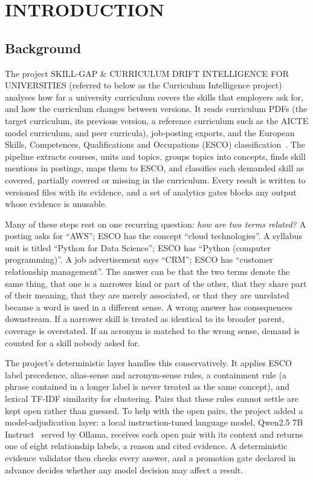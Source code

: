 \chapter{INTRODUCTION}
\label{ch:intro}

\section{Background}
\label{sec:background}

The project SKILL-GAP \& CURRICULUM DRIFT INTELLIGENCE FOR UNIVERSITIES (referred to below as the Curriculum Intelligence project) analyses how far a university curriculum covers the skills that employers ask for, and how the curriculum changes between versions. It reads curriculum PDFs (the target curriculum, its previous version, a reference curriculum such as the AICTE model curriculum, and peer curricula), job-posting exports, and the European Skills, Competences, Qualifications and Occupations (ESCO) classification~\cite{esco2024model}. The pipeline extracts courses, units and topics, groups topics into concepts, finds skill mentions in postings, maps them to ESCO, and classifies each demanded skill as covered, partially covered or missing in the curriculum. Every result is written to versioned files with its evidence, and a set of analytics gates blocks any output whose evidence is unusable.

Many of these steps rest on one recurring question: \emph{how are two terms related?} A posting asks for ``AWS''; ESCO has the concept ``cloud technologies''. A syllabus unit is titled ``Python for Data Science''; ESCO has ``Python (computer programming)''. A job advertisement says ``CRM''; ESCO has ``customer relationship management''. The answer can be that the two terms denote the same thing, that one is a narrower kind or part of the other, that they share part of their meaning, that they are merely associated, or that they are unrelated because a word is used in a different sense. A wrong answer has consequences downstream. If a narrower skill is treated as identical to its broader parent, coverage is overstated. If an acronym is matched to the wrong sense, demand is counted for a skill nobody asked for.

The project's deterministic layer handles this conservatively. It applies ESCO label precedence, alias-sense and acronym-sense rules, a containment rule (a phrase contained in a longer label is never treated as the same concept), and lexical TF-IDF similarity for clustering. Pairs that these rules cannot settle are kept open rather than guessed. To help with the open pairs, the project added a model-adjudication layer: a local instruction-tuned language model, Qwen2.5 7B Instruct~\cite{qwen2024} served by Ollama, receives each open pair with its context and returns one of eight relationship labels, a reason and cited evidence. A deterministic evidence validator then checks every answer, and a promotion gate declared in advance decides whether any model decision may affect a result.

